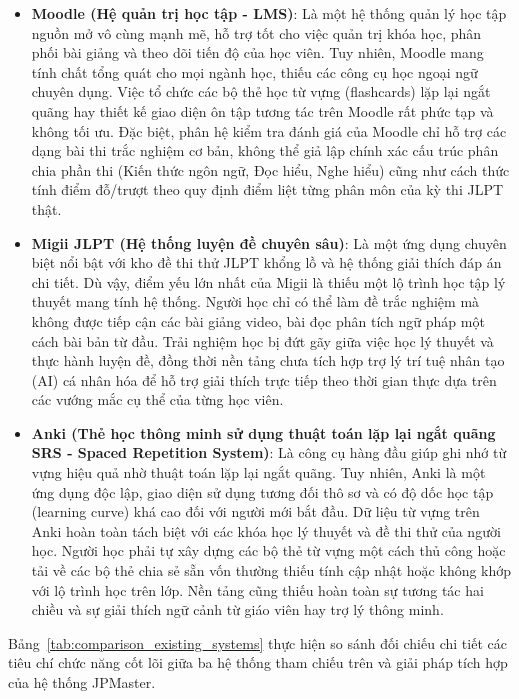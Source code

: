 \documentclass[../DoAn.tex]{subfiles}
\begin{document}
\begin{itemize}
    \item \textbf{Moodle (Hệ quản trị học tập - LMS)}: Là một hệ thống quản lý học tập nguồn mở vô cùng mạnh mẽ, hỗ trợ tốt cho việc quản trị khóa học, phân phối bài giảng và theo dõi tiến độ của học viên. Tuy nhiên, Moodle mang tính chất tổng quát cho mọi ngành học, thiếu các công cụ học ngoại ngữ chuyên dụng. Việc tổ chức các bộ thẻ học từ vựng (flashcards) lặp lại ngắt quãng hay thiết kế giao diện ôn tập tương tác trên Moodle rất phức tạp và không tối ưu. Đặc biệt, phân hệ kiểm tra đánh giá của Moodle chỉ hỗ trợ các dạng bài thi trắc nghiệm cơ bản, không thể giả lập chính xác cấu trúc phân chia phần thi (Kiến thức ngôn ngữ, Đọc hiểu, Nghe hiểu) cũng như cách thức tính điểm đỗ/trượt theo quy định điểm liệt từng phân môn của kỳ thi JLPT thật.
    
    \item \textbf{Migii JLPT (Hệ thống luyện đề chuyên sâu)}: Là một ứng dụng chuyên biệt nổi bật với kho đề thi thử JLPT khổng lồ và hệ thống giải thích đáp án chi tiết. Dù vậy, điểm yếu lớn nhất của Migii là thiếu một lộ trình học tập lý thuyết mang tính hệ thống. Người học chỉ có thể làm đề trắc nghiệm mà không được tiếp cận các bài giảng video, bài đọc phân tích ngữ pháp một cách bài bản từ đầu. Trải nghiệm học bị đứt gãy giữa việc học lý thuyết và thực hành luyện đề, đồng thời nền tảng chưa tích hợp trợ lý trí tuệ nhân tạo (AI) cá nhân hóa để hỗ trợ giải thích trực tiếp theo thời gian thực dựa trên các vướng mắc cụ thể của từng học viên.
    
    \item \textbf{Anki (Thẻ học thông minh sử dụng thuật toán lặp lại ngắt quãng SRS - Spaced Repetition System)}: Là công cụ hàng đầu giúp ghi nhớ từ vựng hiệu quả nhờ thuật toán lặp lại ngắt quãng. Tuy nhiên, Anki là một ứng dụng độc lập, giao diện sử dụng tương đối thô sơ và có độ dốc học tập (learning curve) khá cao đối với người mới bắt đầu. Dữ liệu từ vựng trên Anki hoàn toàn tách biệt với các khóa học lý thuyết và đề thi thử của người học. Người học phải tự xây dựng các bộ thẻ từ vựng một cách thủ công hoặc tải về các bộ thẻ chia sẻ sẵn vốn thường thiếu tính cập nhật hoặc không khớp với lộ trình học trên lớp. Nền tảng cũng thiếu hoàn toàn sự tương tác hai chiều và sự giải thích ngữ cảnh từ giáo viên hay trợ lý thông minh.
\end{itemize}

Bảng~\ref{tab:comparison_existing_systems} thực hiện so sánh đối chiếu chi tiết các tiêu chí chức năng cốt lõi giữa ba hệ thống tham chiếu trên và giải pháp tích hợp của hệ thống JPMaster.
\end{document}
